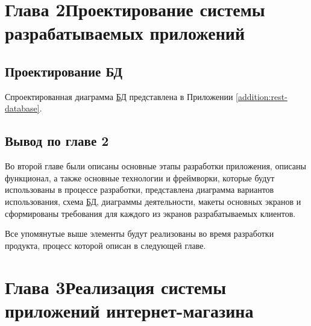 \documentclass[14pt,a4paper]{scrartcl}
\begin{document}
    \pagestyle{empty}

    

    

    \clearpage
    \tableofcontents\thispagestyle{empty}

    
    \pagestyle{plain}
    
    
    
    \section[Глава 2 Проектирование системы разрабатываемых приложений]{Глава 2\break Проектирование системы разрабатываемых приложений}
    \label{sec:charpter-2-designing}

    
    
    
    

    \subsection{Проектирование БД}\label{subsec:design-db}\indent

    Спроектированная диаграмма \hyperlink{gloss:db}{БД} представлена в Приложении \ref{addition:rest-database}.

    
    
    
    

    \subsection{Вывод по главе 2}\label{subsec:2-conclusion}\indent

    Во второй главе были описаны основные этапы разработки приложения, описаны функционал, а также основные технологии и фреймворки, которые будут использованы в процессе разработки, представлена диаграмма вариантов использования, схема \hyperlink{gloss:db}{БД}, диаграммы деятельности, макеты основных экранов и сформированы требования для каждого из экранов разрабатываемых клиентов.

    Все упомянутые выше элементы будут реализованы во время разработки продукта, процесс которой описан в следующей главе.

    \section[Глава 3 Реализация системы приложений интернет-магазина]{Глава 3\break Реализация системы приложений интернет-магазина}
    \label{sec:charpter-3-inplementation}
\end{document}
